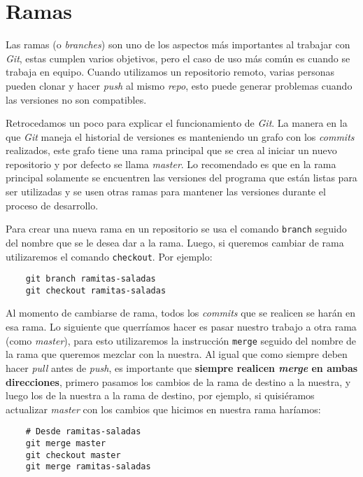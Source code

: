 \section{Ramas}
  Las ramas (o \textit{branches}) son uno de los aspectos más importantes al trabajar con 
  \textit{Git}, estas cumplen varios objetivos, pero el caso de uso más común es cuando se trabaja
  en equipo.
  Cuando utilizamos un repositorio remoto, varias personas pueden clonar y hacer \textit{push} al 
  mismo \textit{repo}, esto puede generar problemas cuando las versiones no son compatibles.

  Retrocedamos un poco para explicar el funcionamiento de \textit{Git}.
  La manera en la que \textit{Git} maneja el historial de versiones es manteniendo un grafo con los
  \textit{commits} realizados, este grafo tiene una rama principal que se crea al iniciar un nuevo
  repositorio y por defecto se llama \textit{master}.
  Lo recomendado es que en la rama principal solamente se encuentren las versiones del programa que
  están listas para ser utilizadas y se usen otras ramas para mantener las versiones durante el 
  proceso de desarrollo.

  Para crear una nueva rama en un repositorio se usa el comando \texttt{branch} seguido del nombre
  que se le desea dar a la rama.
  Luego, si queremos cambiar de rama utilizaremos el comando \texttt{checkout}.
  Por ejemplo:
  \begin{verbatim}
    git branch ramitas-saladas
    git checkout ramitas-saladas
  \end{verbatim}

  Al momento de cambiarse de rama, todos los \textit{commits} que se realicen se harán en esa rama.
  Lo siguiente que querríamos hacer es pasar nuestro trabajo a otra rama (como \textit{master}), 
  para esto utilizaremos la instrucción \texttt{merge} seguido del nombre de la rama que queremos 
  mezclar con la nuestra.
  Al igual que como siempre deben hacer \textit{pull} antes de \textit{push}, es importante que 
  \textbf{siempre realicen \textit{merge} en ambas direcciones}, primero pasamos los cambios de la 
  rama de destino a la nuestra, y luego los de la nuestra a la rama de destino, por ejemplo, si 
  quisiéramos actualizar \textit{master} con los cambios que hicimos en nuestra rama haríamos:
  \begin{verbatim}
    # Desde ramitas-saladas
    git merge master
    git checkout master
    git merge ramitas-saladas
  \end{verbatim}
